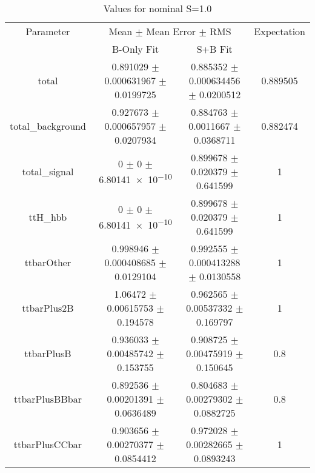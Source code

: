 \begin{table}
\centering
\caption{Values for nominal S=1.0}
\begin{tabular}{cccc}
\toprule
Parameter & \multicolumn{2}{c}{Mean $\pm$ Mean Error $\pm$ RMS} & Expectation\\
 & B-Only Fit & S+B Fit & \\
\midrule
total & \num{0.891029} $\pm$ \num{0.000631967} $\pm$ \num{0.0199725} & \num{0.885352} $\pm$ \num{0.000634456} $\pm$ \num{0.0200512} & \num{0.889505}\\
total\_background & \num{0.927673} $\pm$ \num{0.000657957} $\pm$ \num{0.0207934} & \num{0.884763} $\pm$ \num{0.0011667} $\pm$ \num{0.0368711} & \num{0.882474}\\
total\_signal & \num{0} $\pm$ \num{0} $\pm$ \num{6.80141e-10} & \num{0.899678} $\pm$ \num{0.020379} $\pm$ \num{0.641599} & \num{1}\\
ttH\_hbb & \num{0} $\pm$ \num{0} $\pm$ \num{6.80141e-10} & \num{0.899678} $\pm$ \num{0.020379} $\pm$ \num{0.641599} & \num{1}\\
ttbarOther & \num{0.998946} $\pm$ \num{0.000408685} $\pm$ \num{0.0129104} & \num{0.992555} $\pm$ \num{0.000413288} $\pm$ \num{0.0130558} & \num{1}\\
ttbarPlus2B & \num{1.06472} $\pm$ \num{0.00615753} $\pm$ \num{0.194578} & \num{0.962565} $\pm$ \num{0.00537332} $\pm$ \num{0.169797} & \num{1}\\
ttbarPlusB & \num{0.936033} $\pm$ \num{0.00485742} $\pm$ \num{0.153755} & \num{0.908725} $\pm$ \num{0.00475919} $\pm$ \num{0.150645} & \num{0.8}\\
ttbarPlusBBbar & \num{0.892536} $\pm$ \num{0.00201391} $\pm$ \num{0.0636489} & \num{0.804683} $\pm$ \num{0.00279302} $\pm$ \num{0.0882725} & \num{0.8}\\
ttbarPlusCCbar & \num{0.903656} $\pm$ \num{0.00270377} $\pm$ \num{0.0854412} & \num{0.972028} $\pm$ \num{0.00282665} $\pm$ \num{0.0893243} & \num{1}\\
\bottomrule
\end{tabular}
\end{table}